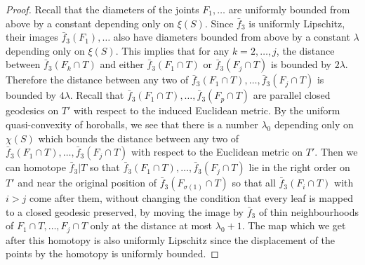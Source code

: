 \documentclass{amsart}
\theoremstyle{definition}
\numberwithin{figure}{section}
\numberwithin{equation}{section}
\begin{document}
\begin{proof}
Recall that the diameters of the joints $F_1, \dots $ are uniformly bounded from above by a constant depending only on $\xi(S)$.
Since $\bar f_3$ is uniformly Lipschitz, their images $\bar f_3(F_1), \dots $ also have diameters bounded from above by a constant $\lambda$ depending only on $\xi(S)$.
This implies that for any $k =2, \dots , j$, the distance between   $\bar f_3(F_k \cap T)$ and either $\bar f_3(F_1 \cap T)$ 
or $\bar f_3(F_j \cap T)$ is  bounded by $2\lambda$.
Therefore the distance between any two of $\bar f_3(F_1 \cap T) , \dots , \bar f_3(F_j \cap T)$ is bounded by $4\lambda$.
Recall that $\bar f_3(F_1 \cap T), \dots , \bar f_3(F_p \cap T)$ are parallel closed geodesics on $T'$ with respect to the induced Euclidean metric.
By the uniform quasi-convexity of horoballs, we see that there is a number $\lambda_0$ depending only on $\chi(S)$ which bounds the distance between any two of $\bar f_3(F_1 \cap T), \dots , \bar f_3(F_j \cap T)$ with respect to the Euclidean metric on $T'$.
Then we can homotope $\bar f_3|T$ so that $\bar f_3(F_1 \cap T), \dots ,\bar f_3(F_j \cap T)$ lie in the right order on $T'$ and near the original position of $\bar f_3(F_{\sigma(1)} \cap T)$ so that all $\bar f_3(F_i \cap T)$ with $i >j$ come after them, without changing  the condition that every leaf is mapped to a closed geodesic preserved, by moving the image by $\bar f_3$ of  thin neighbourhoods of $F_1\cap T, \dots , F_j\cap T$ only at the distance at most $\lambda_0+1$.
The map which we get after this homotopy is also uniformly Lipschitz since the displacement of the points by the homotopy is uniformly bounded.



%




\end{proof}
\end{document}
